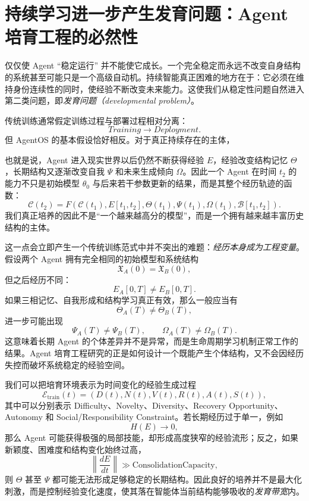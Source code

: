 \section{持续学习进一步产生发育问题：Agent 培育工程的必然性}

仅仅使 Agent ``稳定运行'' 并不能使它成长。一个完全稳定而永远不改变自身结构的系统甚至可能只是一个高级自动机。持续智能真正困难的地方在于：它必须在维持身份连续性的同时，使经验不断改变未来能力。这使我们从稳定性问题自然进入第二类问题，即\emph{发育问题（developmental problem）}。

传统训练通常假定训练过程与部署过程相对分离：
\[
Training
\rightarrow
Deployment.
\]
但 AgentOS 的基本假设恰好相反。对于真正持续存在的主体，
\begin{statementbox}
\centering
{}
\end{statementbox}
也就是说，Agent 进入现实世界以后仍然不断获得经验 $E$，经验改变结构记忆 $\Theta$，长期结构又逐渐改变自我 $\Psi$ 和未来生成倾向 $\Omega$。因此一个 Agent 在时间 $t_2$ 的能力不只是初始模型 $\theta_0$ 与后来若干参数更新的结果，而是其整个经历轨迹的函数：
\[
\mathcal C(t_2)
=
F
\left(
\mathcal C(t_1),
E[t_1,t_2],
\Theta(t_1),
\Psi(t_1),
\Omega(t_1),
\mathcal B[t_1,t_2]
\right).
\]
我们真正培养的因此不是“一个越来越高分的模型”，而是一个拥有越来越丰富历史结构的主体。

这一点会立即产生一个传统训练范式中并不突出的难题：\emph{经历本身成为工程变量}。假设两个 Agent 拥有完全相同的初始模型和系统结构
\[
\mathfrak X_A(0)
=
\mathfrak X_B(0),
\]
但之后经历不同：
\[
E_A[0,T]\neq E_B[0,T].
\]
如果三相记忆、自我形成和结构学习真正有效，那么一般应当有
\[
\Theta_A(T)\neq\Theta_B(T),
\]
进一步可能出现
\[
\Psi_A(T)\neq\Psi_B(T),
\qquad
\Omega_A(T)\neq\Omega_B(T).
\]
这意味着长期 Agent 的个体差异并不是异常，而是生命周期学习机制正常工作的结果。Agent 培育工程研究的正是如何设计一个既能产生个体结构，又不会因经历失控而破坏系统稳定的经验空间。

我们可以把培育环境表示为时间变化的经验生成过程
\[
\mathcal E_{\mathrm{train}}(t)
=
\left(
D(t),
N(t),
V(t),
R(t),
A(t),
S(t)
\right),
\]
其中可以分别表示 Difficulty、Novelty、Diversity、Recovery Opportunity、Autonomy 和 Social/Responsibility Constraint。若长期经历过于单一，例如
\[
H(E)\rightarrow 0,
\]
那么 Agent 可能获得极强的局部技能，却形成高度狭窄的经验流形；反之，如果新颖度、困难度和结构变化始终过高，
\[
\left\|
\frac{dE}{dt}
\right\|
\gg
\text{ConsolidationCapacity},
\]
则 $\Theta$ 甚至 $\Psi$ 都可能无法形成足够稳定的长期结构。因此良好的培养并不是最大化刺激，而是控制经验变化速度，使其落在智能体当前结构能够吸收的\emph{发育带宽}内。


